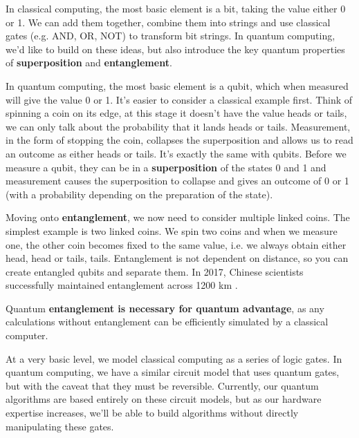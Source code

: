 \documentclass{article}
\theoremstyle{definition}
\begin{document}
In classical computing, the most basic element is a bit, taking the value either 0 or 1. We can add them together, combine them into strings and use classical gates (e.g. AND, OR, NOT) to transform bit strings. In quantum computing, we'd like to build on these ideas, but also introduce the key quantum properties of \textbf{superposition} and \textbf{entanglement}.

In quantum computing, the most basic element is a qubit, which when measured will give the value 0 or 1. It's easier to consider a classical example first. Think of spinning a coin on its edge, at this stage it doesn't have the value heads or tails, we can only talk about the probability that it lands heads or tails. Measurement, in the form of stopping the coin, collapses the superposition and allows us to read an outcome as either heads or tails. It's exactly the same with qubits. Before we measure a qubit, they can be in a \textbf{superposition} of the states 0 and 1 and measurement causes the superposition to collapse and gives an outcome of 0 or 1 (with a probability depending on the preparation of the state).

Moving onto \textbf{entanglement}, we now need to consider multiple linked coins. The simplest example is two linked coins. We spin two coins and when we measure one, the other coin becomes fixed to the same value, i.e. we always obtain either head, head or tails, tails. Entanglement is not dependent on distance, so you can create entangled qubits and separate them. In 2017, Chinese scientists successfully maintained entanglement across 1200 km \cite{Yin1140}. 

Quantum \textbf{entanglement is necessary for quantum advantage}, as any calculations without entanglement can be efficiently simulated by a classical computer. 

At a very basic level, we model classical computing as a series of logic gates. In quantum computing, we have a similar circuit model that uses quantum gates, but with the caveat that they must be reversible. Currently, our quantum algorithms are based entirely on these circuit models, but as our hardware expertise increases, we'll be able to build algorithms without directly manipulating these gates.
\end{document}
